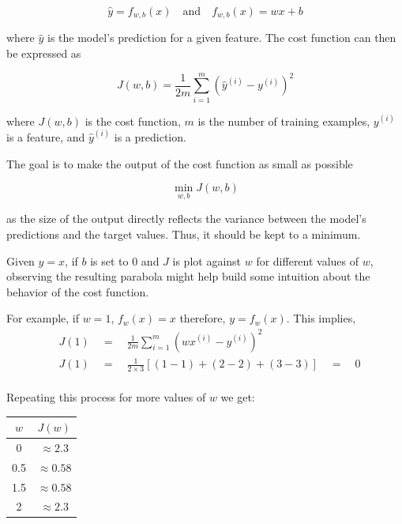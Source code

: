 \documentclass{article}
\begin{document}
\[
\hat{y} =  f_{w, b}(x) \quad \textrm{and} \quad f_{w, b}(x) = wx + b
\]

\noindent where $\hat{y}$ is the model's prediction for a given feature. The cost function can then be expressed as

\[ J(w, b) = \frac{1}{2m}\sum^{m}_{i = 1}{ ({ \hat{y}^{(i)} - y^{(i)} })^2 }\]

\noindent where $J(w, b)$ is the cost function, $m$ is the number of training examples, $y^{(i)}$ is a feature, and $\hat{y}^{(i)}$ is a prediction.

\noindent The goal is to make the output of the cost function as small as possible

\[\min_{w, b}J(w, b)\]

\noindent as the size of the output directly reflects the variance between the model's predictions and the target values. Thus, it should be kept to a minimum. 

Given $y = x$, if $b$ is set to 0 and $J$ is plot against $w$ for different values of $w$, observing the resulting parabola might help build some intuition about the behavior of the cost function.

\noindent For example, if $w = 1$, $f_{w}(x) = x$ therefore, $y = f_{w}(x)$. This implies,
\begin{align*}
&J(1) \quad=\quad \frac{1}{2m}\sum^m_{i=1}{ (wx^{(i)} - y^{(i)})^2 } \\
&J(1) \quad=\quad \frac{1}{2\times3}[(1-1) + (2-2) + (3-3)] \quad=\quad 0 \\
\end{align*}

\noindent Repeating this process for more values of $w$ we get:

\begin{center}
\centering
\begin{tabular}{|c|c|}
\hline
\textbf{$w$} & \textbf{$J(w)$} \\
\hline
0 & $\approx 2.3$ \\
\hline
0.5 & $\approx 0.58$ \\
\hline
1.5 & $\approx 0.58$ \\
\hline
2 & $\approx 2.3$ \\
\hline
\end{tabular}
\end{center}

\begin{center}
\end{center}
\end{document}
